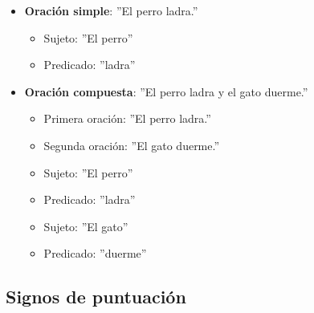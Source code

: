 \begin{itemize}
      \item \textbf{Oración simple}: ''El perro ladra.''
            \begin{itemize}
                  \item Sujeto: ''El perro''
                  \item Predicado: ''ladra''
            \end{itemize}
      \item \textbf{Oración compuesta}: ''El perro ladra y el gato duerme.''
            \begin{itemize}
                  \item Primera oración: ''El perro ladra.''
                  \item Segunda oración: ''El gato duerme.''
                  \item Sujeto: ''El perro''
                  \item Predicado: ''ladra''
                  \item Sujeto: ''El gato''
                  \item Predicado: ''duerme''
            \end{itemize}
\end{itemize}

\subsection{Signos de puntuación}

